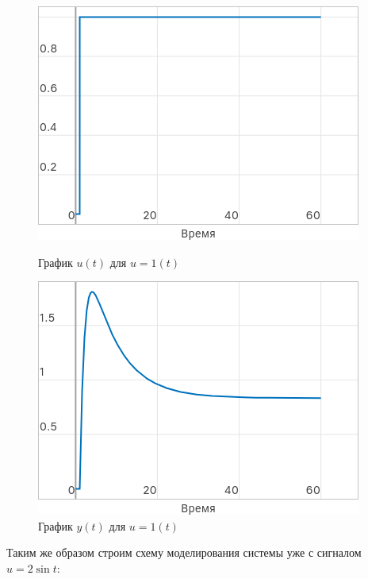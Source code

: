 \documentclass[a4paper]{article}
\begin{document}
\begin{figure}[H]
    \centering
    \begin{minipage}{0.4\textwidth}
        \includegraphics[width=\textwidth]{sources/task1_1t_u.png}
        \caption*{График $u(t)$ для $u=1(t)$}
    \end{minipage}
    \hspace{2em}
    \begin{minipage}{0.4\textwidth}
        \includegraphics[width=\textwidth]{sources/task1_1t_y.png}
        \caption*{График $y(t)$ для $u=1(t)$}
    \end{minipage}
\end{figure}
Таким же образом строим схему моделирования системы уже с сигналом $u=2\sin{t}$:
\end{document}
